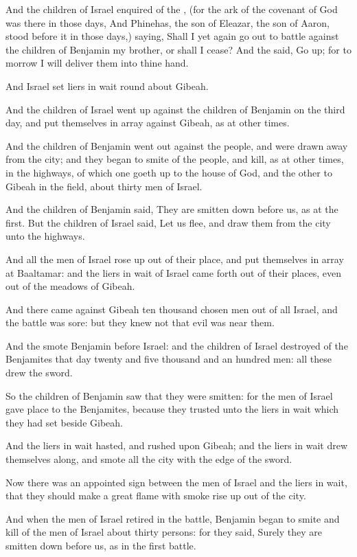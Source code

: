 \verse And the children of Israel enquired of the \LORD, (for the ark of the covenant of God was there in those days, \verse And Phinehas, the son of Eleazar, the son of Aaron, stood before it in those days,) saying, Shall I yet again go out to battle against the children of Benjamin my brother, or shall I cease? And the \LORD said, Go up; for to morrow I will deliver them into thine hand.

\verse And Israel set liers in wait round about Gibeah.

\verse And the children of Israel went up against the children of Benjamin on the third day, and put themselves in array against Gibeah, as at other times.

\verse And the children of Benjamin went out against the people, and were drawn away from the city; and they began to smite of the people, and kill, as at other times, in the highways, of which one goeth up to the house of God, and the other to Gibeah in the field, about thirty men of Israel.

\verse And the children of Benjamin said, They are smitten down before us, as at the first. But the children of Israel said, Let us flee, and draw them from the city unto the highways.

\verse And all the men of Israel rose up out of their place, and put themselves in array at Baaltamar: and the liers in wait of Israel came forth out of their places, even out of the meadows of Gibeah.

\verse And there came against Gibeah ten thousand chosen men out of all Israel, and the battle was sore: but they knew not that evil was near them.

\verse And the \LORD smote Benjamin before Israel: and the children of Israel destroyed of the Benjamites that day twenty and five thousand and an hundred men: all these drew the sword.

\verse So the children of Benjamin saw that they were smitten: for the men of Israel gave place to the Benjamites, because they trusted unto the liers in wait which they had set beside Gibeah.

\verse And the liers in wait hasted, and rushed upon Gibeah; and the liers in wait drew themselves along, and smote all the city with the edge of the sword.

\verse Now there was an appointed sign between the men of Israel and the liers in wait, that they should make a great flame with smoke rise up out of the city.

\verse And when the men of Israel retired in the battle, Benjamin began to smite and kill of the men of Israel about thirty persons: for they said, Surely they are smitten down before us, as in the first battle.

